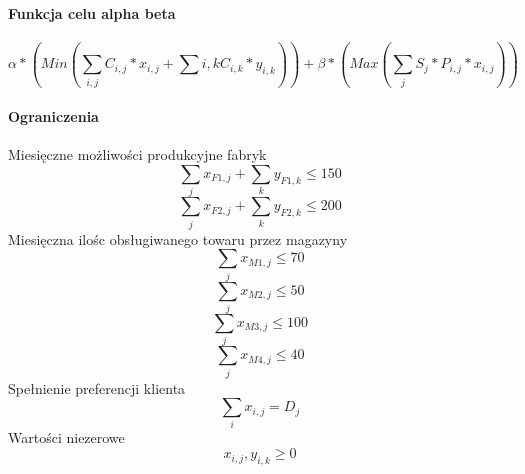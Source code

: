 \paragraph{Funkcja celu alpha beta}
\[ \alpha * (Min(\sum_{i, j} C_{i, j} * x_{i, j} + \sum{i, k} C_{i, k} * y_{i, k})) + \beta * (Max(\sum_{j} S_j * P_{i,j} * x_{i, j}))  \]
\paragraph{Ograniczenia}
Miesięczne możliwości produkcyjne fabryk
\begin{equation}
    \sum_j x_{F1, j} + \sum_k y_{F1, k} \leq 150
\end{equation}
\begin{equation}
    \sum_j x_{F2, j} + \sum_k y_{F2, k} \leq 200
\end{equation}
Miesięczna ilośc obsługiwanego towaru przez magazyny 
\begin{equation}
    \sum_j x_{M1, j} \leq 70
\end{equation}
\begin{equation}
    \sum_j x_{M2, j} \leq 50
\end{equation}
\begin{equation}
    \sum_j x_{M3, j} \leq 100
\end{equation}
\begin{equation}
    \sum_j x_{M4, j} \leq 40
\end{equation}
Spełnienie preferencji klienta 
\begin{equation}
    \sum_i x_{i, j} = D_j
\end{equation}
Wartości niezerowe 
\begin{equation}
    x_{i, j}, y_{i, k} \geq 0
\end{equation}

